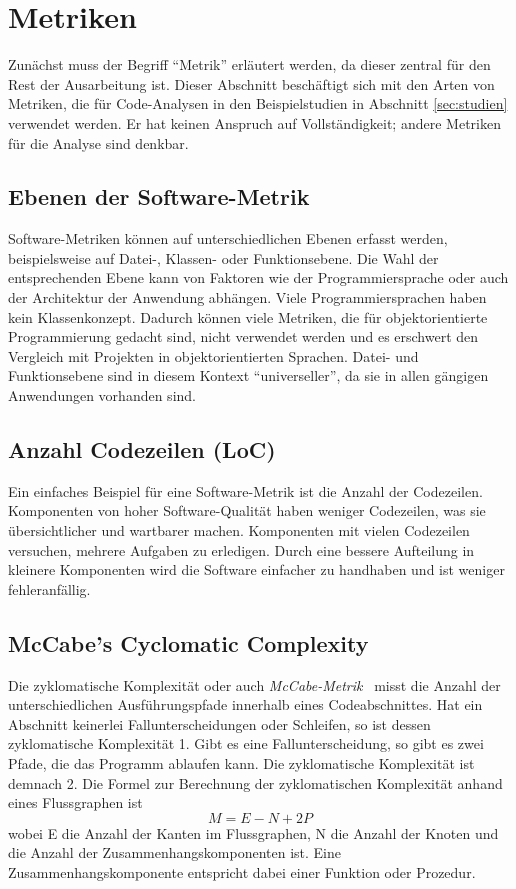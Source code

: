 \section{Metriken}
\label{sec:metriken}
Zunächst muss der Begriff "`Metrik"' erläutert werden, da dieser zentral für den Rest der Ausarbeitung ist.
Dieser Abschnitt beschäftigt sich mit den Arten von Metriken, die für Code-Analysen in den Beispielstudien in Abschnitt \ref{sec:studien} verwendet werden.
Er hat keinen Anspruch auf Vollständigkeit; andere Metriken für die Analyse sind denkbar.

\subsection{Ebenen der Software-Metrik}
Software-Metriken können auf unterschiedlichen Ebenen erfasst werden, beispielsweise auf Datei-, Klassen- oder Funktionsebene.
Die Wahl der entsprechenden Ebene kann von Faktoren wie der Programmiersprache oder auch der Architektur der Anwendung abhängen.
Viele Programmiersprachen haben kein Klassenkonzept.
Dadurch können viele Metriken, die für objektorientierte Programmierung gedacht sind, nicht verwendet werden und es erschwert den Vergleich mit Projekten in objektorientierten Sprachen.
Datei- und Funktionsebene sind in diesem Kontext "`universeller"', da sie in allen gängigen Anwendungen vorhanden sind.

\subsection{Anzahl Codezeilen (LoC)}
Ein einfaches Beispiel für eine Software-Metrik ist die Anzahl der Codezeilen.
Komponenten von hoher Software-Qualität haben weniger Codezeilen, was sie übersichtlicher und wartbarer machen.
Komponenten mit vielen Codezeilen versuchen, mehrere Aufgaben zu erledigen.
Durch eine bessere Aufteilung in kleinere Komponenten wird die Software einfacher zu handhaben und ist weniger fehleranfällig.

\subsection{McCabe's Cyclomatic Complexity}
Die zyklomatische Komplexität oder auch \emph{McCabe-Metrik}~\cite{mccabe1976} misst die Anzahl der unterschiedlichen Ausführungspfade innerhalb eines Codeabschnittes.
Hat ein Abschnitt keinerlei Fallunterscheidungen oder Schleifen, so ist dessen zyklomatische Komplexität 1.
Gibt es eine Fallunterscheidung, so gibt es zwei Pfade, die das Programm ablaufen kann.
Die zyklomatische Komplexität ist demnach 2.
Die Formel zur Berechnung der zyklomatischen Komplexität anhand eines Flussgraphen ist
\begin{equation}
	M = E - N + 2P
\end{equation}
wobei E die Anzahl der Kanten im Flussgraphen, N die Anzahl der Knoten und die Anzahl der Zusammenhangskomponenten ist.
Eine Zusammenhangskomponente entspricht dabei einer Funktion oder Prozedur.
